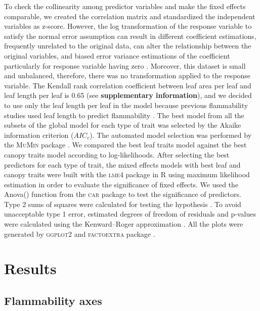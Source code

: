 \documentclass{bmcart}
\newcommand{\pkg}[1]{\textsc{#1}}
\begin{document}
To check the collinearity among predictor variables and make the fixed effects comparable, we created the correlation matrix and standardized the independent variables as z-score. However, the log transformation of the response variable to satisfy the normal error assumption can result in different coefficient estimations, frequently unrelated to the original data, can alter the relationship between the original variables, and biased error variance estimations of the coefficient particularly for response variable having zero \citep{mccuen1990problems,packard2008model,o2010not, changyong2014log, st2018count}. Moreover, this dataset is small and unbalanced, therefore, there was no transformation applied to the response variable. The Kendall rank correlation coefficient between leaf area per leaf and leaf length per leaf is 0.65 (see \textbf{supplementary information}), and we decided to use only the leaf length per leaf in the model because previous flammability studies used leaf length to predict flammability \citep{alam2020shoot}. 
The best model from all the subsets of the global model for each type of trait was selected by the Akaike information criterion ($AIC_{c}$). The automated model selection was performed by the \pkg{MuMin} package \citep{barton2015packagemumin}. We compared the best leaf traits model against the best canopy traits model according to log-likelihoods. After selecting the best predictors for each type of trait, the mixed effects models with best leaf and canopy traits were built with the \pkg{lme4} package in R \citep{bates2009package} using maximum likelihood estimation in order to evaluate the significance of fixed effects. We used the Anova() function from the \pkg{car} package \citep{fox2013hypothesis} to test the significance of predictors. Type  2  sums  of  squares  were  calculated  for testing the hypothesis \citep{langsrud2003anova}. To avoid unacceptable type 1 error, estimated degrees of freedom of residuals and p-values were calculated using the Kenward--Roger approximation \citep{kenward1997small}. All the plots were generated by \pkg{ggplot2} and \pkg{factoextra} package \citep{wickham2016packageggplot2, kassambara2017packagefactoextra}.



\section*{Results}

\subsection*{Flammability axes}
\end{document}
